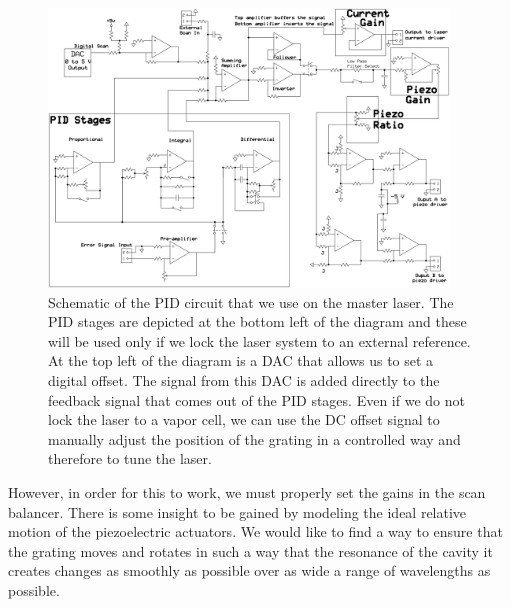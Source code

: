 \begin{figure}
\centerline{
\includegraphics[width=0.95\textwidth]{PIDfromCJEdiss}}
\caption[Schematic of PID circuit]{\label{circuit} Schematic of the PID circuit that we use on the master laser. The PID stages are depicted at the bottom left of the diagram and these will be used only if we lock the laser system to an external reference. At the top left of the diagram is a DAC that allows us to set a digital offset. The signal from this DAC is added directly to the feedback signal that comes out of the PID stages. Even if we do not lock the laser to a vapor cell, we can use the DC offset signal to manually adjust the position of the grating in a controlled way and therefore to tune the laser.}
\end{figure}


However, in order for this to work, we must properly set the gains in the scan balancer. There is some insight to be gained by modeling the ideal relative motion of the piezoelectric actuators. We would like to find a way to ensure that the grating moves and rotates in such a way that the resonance of the cavity it creates changes as smoothly as possible over as wide a range of wavelengths as possible. 

